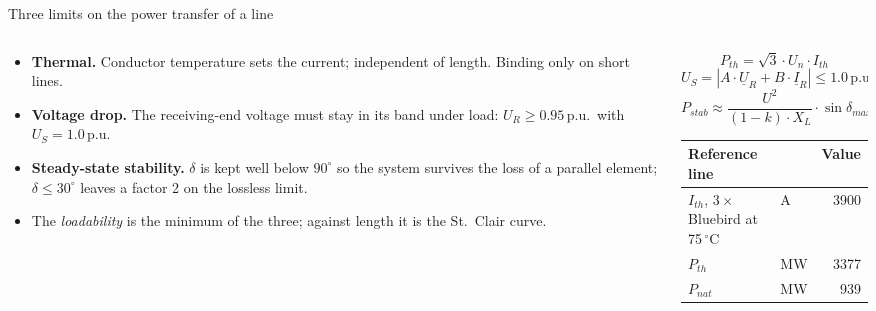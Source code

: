 \begin{frame}{Three limits on the power transfer of a line}
  \begin{columns}[T,onlytextwidth]
    \begin{column}{0.50\textwidth}
      {\small
      \begin{itemize}
        \setlength{\itemsep}{0.45em}
        \item \textbf{Thermal.} Conductor temperature sets the current;
              independent of length. Binding only on short lines.
        \item \textbf{Voltage drop.} The receiving-end voltage must stay
              in its band under load: $U_R\ge0.95$\,p.u.\ with
              $U_S=1.0$\,p.u.
        \item \textbf{Steady-state stability.} $\delta$ is kept well below
              $90^\circ$ so the system survives the loss of a parallel
              element; $\delta\le30^\circ$ leaves a factor 2 on the
              lossless limit.
        \item The \emph{loadability} is the minimum of the three; against
              length it is the St.~Clair curve.
      \end{itemize}}
    \end{column}
    \begin{column}{0.47\textwidth}
      \setlength{\abovedisplayskip}{4pt}\setlength{\belowdisplayskip}{4pt}
      \[ P_{th} = \sqrt{3}\cdot U_n\cdot I_{th} \]
      \[ U_S = \left|A\cdot\underline{U}_R + B\cdot\underline{I}_R\right|
         \le 1.0\,\text{p.u.} \]
      \[ P_{stab} \approx \frac{U^2}{\left(1-k\right)\cdot X_L}\cdot\sin\delta_{max} \]
      \renewcommand{\arraystretch}{1.1}
      {\footnotesize
      \begin{tabular}{@{}l l r@{}}
        \textbf{Reference line} & & \multicolumn{1}{c}{\textbf{Value}} \\
        \hline
        $I_{th}$, $3\times$ Bluebird at 75\,$^\circ$C & A & 3900 \\
        $P_{th}$ & MW & 3377 \\
        $P_{nat}$ & MW & 939 \\
        \hline
      \end{tabular}}
    \end{column}
  \end{columns}
\end{frame}

